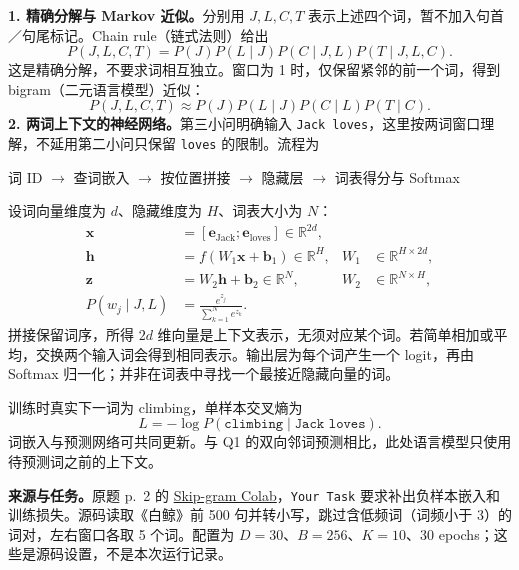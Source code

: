 \textbf{1. 精确分解与 Markov 近似。}分别用 $J,L,C,T$ 表示上述四个词，暂不加入句首／句尾标记。Chain rule（链式法则）给出
\[
 P(J,L,C,T)=P(J)P(L\mid J)P(C\mid J,L)P(T\mid J,L,C).
\]
这是精确分解，不要求词相互独立。窗口为 1 时，仅保留紧邻的前一个词，得到 bigram（二元语言模型）近似：
\[
 \boxed{P(J,L,C,T)\approx P(J)P(L\mid J)P(C\mid L)P(T\mid C).}
\]
\textbf{2. 两词上下文的神经网络。}第三小问明确输入 \texttt{Jack loves}，这里按两词窗口理解，不延用第二小问只保留 \texttt{loves} 的限制。流程为
\begin{center}
\small
词 ID $\longrightarrow$ 查词嵌入 $\longrightarrow$ 按位置拼接
$\longrightarrow$ 隐藏层 $\longrightarrow$ 词表得分与 Softmax
\end{center}
设词向量维度为 $d$、隐藏维度为 $H$、词表大小为 $N$：
\begin{align*}
 \mathbf x&=[\mathbf e_{\text{Jack}};\mathbf e_{\text{loves}}]\in\mathbb R^{2d},\\
 \mathbf h&=f(W_1\mathbf x+\mathbf b_1)\in\mathbb R^H,
 &W_1&\in\mathbb R^{H\times2d},\\
 \mathbf z&=W_2\mathbf h+\mathbf b_2\in\mathbb R^N,
 &W_2&\in\mathbb R^{N\times H},\\
 P(w_j\mid J,L)&=\frac{e^{z_j}}{\sum_{k=1}^{N}e^{z_k}}.
\end{align*}
拼接保留词序，所得 $2d$ 维向量是上下文表示，无须对应某个词。若简单相加或平均，交换两个输入词会得到相同表示。输出层为每个词产生一个 logit，再由 Softmax 归一化；并非在词表中寻找一个最接近隐藏向量的词。

训练时真实下一词为 climbing，单样本交叉熵为
\[
 L=-\log P(\texttt{climbing}\mid\texttt{Jack loves}).
\]
词嵌入与预测网络可共同更新。与 Q1 的双向邻词预测相比，此处语言模型只使用待预测词之前的上下文。

\nopagebreak[4]

\textbf{来源与任务。}原题 p.~2 的
\href{https://colab.research.google.com/drive/1JItaiaN9mEjBg1gavnHi4Iy184ZVgVS2?usp=sharing}{Skip-gram Colab}，\texttt{Your Task} 要求补出负样本嵌入和训练损失。源码读取《白鲸》前 500 句并转小写，跳过含低频词（词频小于 3）的词对，左右窗口各取 5 个词。配置为 $D=30$、$B=256$、$K=10$、30 epochs；这些是源码设置，不是本次运行记录。

